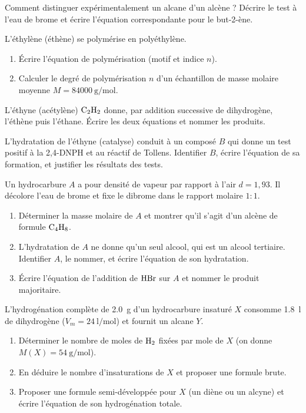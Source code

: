 \exo{} Comment distinguer expérimentalement un alcane d'un alcène ? Décrire
le test à l'eau de brome et écrire l'équation correspondante pour le but-2-ène.


\exo{} L'éthylène (éthène) se polymérise en polyéthylène.
\begin{enumerate}[label=\arabic*)]
\item Écrire l'équation de polymérisation (motif et indice $n$).
\item Calculer le degré de polymérisation $n$ d'un échantillon de masse molaire
moyenne $M = \SI{84000}{\gram\per\mol}$.
\end{enumerate}

\exo{} L'éthyne (acétylène) $\ce{C2H2}$ donne, par addition successive de
dihydrogène, l'éthène puis l'éthane. Écrire les deux équations et nommer les produits.

\exo{} L'hydratation de l'éthyne (catalyse) conduit à un composé $B$ qui
donne un test positif à la 2,4-DNPH et au réactif de Tollens. Identifier $B$, écrire
l'équation de sa formation, et justifier les résultats des tests.


Un hydrocarbure $A$ a pour densité de vapeur par rapport à l'air $d = 1{,}93$. Il
décolore l'eau de brome et fixe le dibrome dans le rapport molaire $1{:}1$.
\begin{enumerate}[label=\arabic*)]
\item Déterminer la masse molaire de $A$ et montrer qu'il s'agit d'un alcène de
formule $\ce{C4H8}$.
\item L'hydratation de $A$ ne donne qu'un seul alcool, qui est un alcool tertiaire.
Identifier $A$, le nommer, et écrire l'équation de son hydratation.
\item Écrire l'équation de l'addition de $\ce{HBr}$ sur $A$ et nommer le produit majoritaire.
\end{enumerate}

L'hydrogénation complète de \SI{2.0}{\gram} d'un hydrocarbure insaturé $X$ consomme
\SI{1.8}{\litre} de dihydrogène ($V_m=\SI{24}{\litre\per\mol}$) et fournit un alcane $Y$.
\begin{enumerate}[label=\arabic*)]
\item Déterminer le nombre de moles de $\ce{H2}$ fixées par mole de $X$ (on donne
$M(X)=\SI{54}{\gram\per\mol}$).
\item En déduire le nombre d'insaturations de $X$ et proposer une formule brute.
\item Proposer une formule semi-développée pour $X$ (un diène ou un alcyne) et écrire
l'équation de son hydrogénation totale.
\end{enumerate}
